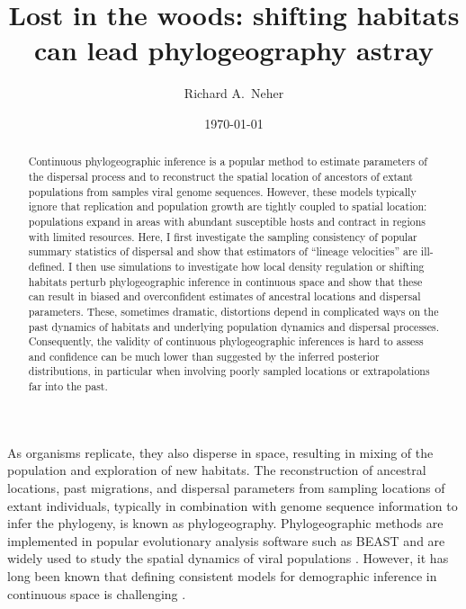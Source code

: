 \documentclass[aps,rmp, twocolumn]{revtex4}
\begin{document}
\title{Lost in the woods: shifting habitats can lead phylogeography astray}
\author{Richard A.~Neher}

\date{\today}
\begin{abstract}
Continuous phylogeographic inference is a popular method to estimate parameters of the dispersal process and to reconstruct the spatial location of ancestors of extant populations from samples viral genome sequences.
However, these models typically ignore that replication and population growth are tightly coupled to spatial location: populations expand in areas with abundant susceptible hosts and contract in regions with limited resources.
Here, I first investigate the sampling consistency of popular summary statistics of dispersal and show that estimators of ``lineage velocities'' are ill-defined.
I then use simulations to investigate how local density regulation or shifting habitats perturb phylogeographic inference in continuous space and show that these can result in biased and overconfident estimates of ancestral locations and dispersal parameters.
These, sometimes dramatic, distortions depend in complicated ways on the past dynamics of habitats and underlying population dynamics and dispersal processes.
Consequently, the validity of continuous phylogeographic inferences is hard to assess and confidence can be much lower than suggested by the inferred posterior distributions, in particular when involving poorly sampled locations or extrapolations far into the past.
\end{abstract}

\maketitle
As organisms replicate, they also disperse in space, resulting in mixing of the population and exploration of new habitats.
The reconstruction of ancestral locations, past migrations, and dispersal parameters from sampling locations of extant individuals, typically in combination with genome sequence information to infer the phylogeny, is known as phylogeography.
Phylogeographic methods are implemented in popular evolutionary analysis software such as BEAST \citep{lemey_bayesian_2009,lemey_phylogeography_2010} and are widely used to study the spatial dynamics of viral populations \citep{dellicour_epidemiological_2020}.
However, it has long been known that defining consistent models for demographic inference in continuous space is challenging \citep{felsenstein_pain_1975,guindon_demographic_2016}.
\end{document}
